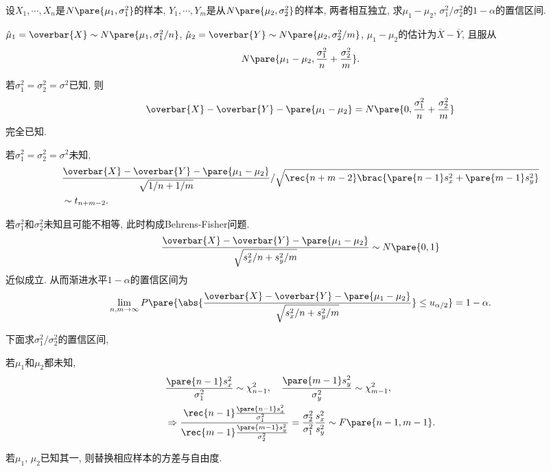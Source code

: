 \documentclass{ctexart}
\begin{document}
\begin{sample}
    \begin{ex}
        设$X_1,\cdots,X_n$是$N\pare{\mu_1,\sigma_1^2}$的样本, $Y_1,\cdots,Y_m$是从$N\pare{\mu_2,\sigma_2^2}$的样本, 两者相互独立, 求$\mu_1 - \mu_2$, $\sigma_1^2 / \sigma_2^2$的$1-\alpha$的置信区间.
    \end{ex}
    \begin{solution}
        $\hat{\mu}_1 = \overbar{X} \sim N\pare{\mu_1, \sigma_1^2/n}$, $\hat\mu_2 = \overbar{Y} \sim N\pare{\mu_2,\sigma_2^2/m}$, $\mu_1 - \mu_2$的估计为$\overbar{X} - \overbar{Y}$, 且服从
        \[ N\pare{\mu_1-\mu_2, \frac{\sigma_1^2}{n} + \frac{\sigma_2^2}{m}}. \]
        \begin{cenum}
            \item 若$\sigma_1^2 = \sigma_2^2 = \sigma^2$已知, 则
            \[ \overbar{X} - \overbar{Y} - \pare{\mu_1 - \mu_2} = N\pare{0, \frac{\sigma_1^2}{n} + \frac{\sigma_2^2}{m}} \]
            完全已知.
            \item 若$\sigma_1^2 = \sigma_2^2 = \sigma^2$未知,
            \begin{align*}
                & \frac{\overbar{X} - \overbar{Y} - \pare{\mu_1 - \mu_2}}{\sqrt{1/n+1/m}}/\sqrt{\rec{n+m-2}\brac{\pare{n-1}s_x^2 + \pare{m-1}s_y^2}} \\ &\sim t_{n+m-2}. 
            \end{align*}
            \item 若$\sigma_1^2$和$\sigma_2^2$未知且可能不相等, 此时构成Behrens-Fisher问题.
            \[ \frac{\overbar{X} - \overbar{Y} - \pare{\mu_1 - \mu_2}}{\sqrt{s_x^2/n + s_y^2/m}} \sim N\pare{0,1} \]
            近似成立. 从而渐进水平$1-\alpha$的置信区间为
            \[ \lim_{n,m\rightarrow\infty} P\pare{\abs{\frac{\overbar{X} - \overbar{Y} - \pare{\mu_1 - \mu_2}}{\sqrt{s_x^2/n + s_y^2/m}}} \le u_{\alpha/2}} = 1-\alpha. \]
        \end{cenum}
        下面求$\sigma_1^2/\sigma_2^2$的置信区间,
        \begin{cenum}
            \item 若$\mu_1$和$\mu_2$都未知,
            \begin{align*}
                & \frac{\pare{n-1}s_x^2}{\sigma_1^2} \sim \chi_{n-1}^2,\quad \frac{\pare{m-1}s_y^2}{\sigma_y^2} \sim \chi_{m-1}^2, \\
                & \Rightarrow \frac{\rec{n-1}\frac{\pare{n-1}s_x^2}{\sigma_1^2}}{\rec{m-1}\frac{\pare{m-1}s_y^2}{\sigma_2^2}} = \frac{\sigma_2^2}{\sigma_1^2} \frac{s_x^2}{s_y^2} \sim F\pare{n-1,m-1}.
            \end{align*}
            \item 若$\mu_1$, $\mu_2$已知其一, 则替换相应样本的方差与自由度. \qedhere
        \end{cenum}
    \end{solution}
\end{sample}
\end{document}
